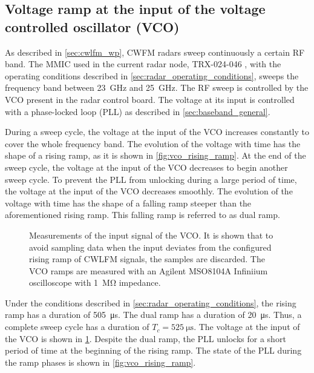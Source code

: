 \subsection{Voltage ramp at the input of the voltage controlled oscillator (VCO)}  \label{sec:vco_characterisation}

As described in \cref{sec:cwlfm_wp}, CWFM radars sweep continuously a certain RF band. The MMIC used in the current radar node, TRX-024-046 \cite{SR2021}, with the operating conditions described in \cref{sec:radar_operating_conditions}, sweeps the frequency band between \SI{23}{\giga\hertz} and \SI{25}{\giga\hertz}. The RF sweep is controlled by the VCO present in the radar control board. The voltage at its input is controlled with a phase-locked loop (PLL) as described in \cref{sec:baseband_general}.

During a sweep cycle, the voltage at the input of the VCO increases constantly to cover the whole frequency band. The evolution of the voltage with time has the shape of a rising ramp, as it is shown in \cref{fig:vco_rising_ramp}. At the end of the sweep cycle, the voltage at the input of the VCO decreases to begin another sweep cycle. To prevent the PLL from unlocking during a large period of time, the voltage at the input of the VCO decreases smoothly. The evolution of the voltage with time has the shape of a falling ramp steeper than the aforementioned rising ramp. This falling ramp is referred to as dual ramp.

\begin{figure}[htb]
	\centering
	\caption{Measurements of the input signal of the VCO. It is shown that to avoid sampling data when the input deviates from the configured rising ramp of CWLFM signals, the samples are discarded. The VCO ramps are measured with an Agilent MSO8104A Infiniium oscilloscope with \SI{1}{\mega\ohm} impedance. \label{fig:vco}}
\end{figure}

Under the conditions described in \cref{sec:radar_operating_conditions}, the rising ramp has a duration of \SI{505}{\micro\second}. The dual ramp has a duration of \SI{20}{\micro\second}. Thus, a complete sweep cycle has a duration of $T_c = \SI{525}{\micro\second}$. The voltage at the input of the VCO is shown in \cref{fig:vco}. Despite the dual ramp, the PLL unlocks for a short period of time at the beginning of the rising ramp. The state of the PLL during the ramp phases is shown in \cref{fig:vco_rising_ramp}.

